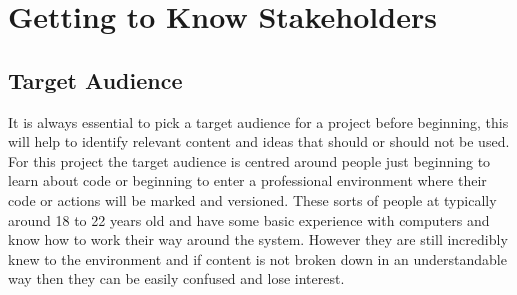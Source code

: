 
\section{Getting to Know Stakeholders}
\subsection{Target Audience}
It is always essential to pick a target audience for a project before beginning, this will help to identify relevant content and ideas that should or should not be used. For this project the target audience is centred around people just beginning to learn about code or beginning to enter a professional environment where their code or actions will be marked and versioned. These sorts of people at typically around 18 to 22 years old and have some basic experience with computers and know how to work their way around the system. However they are still incredibly knew to the environment and if content is not broken down in an understandable way then they can be easily confused and lose interest.

